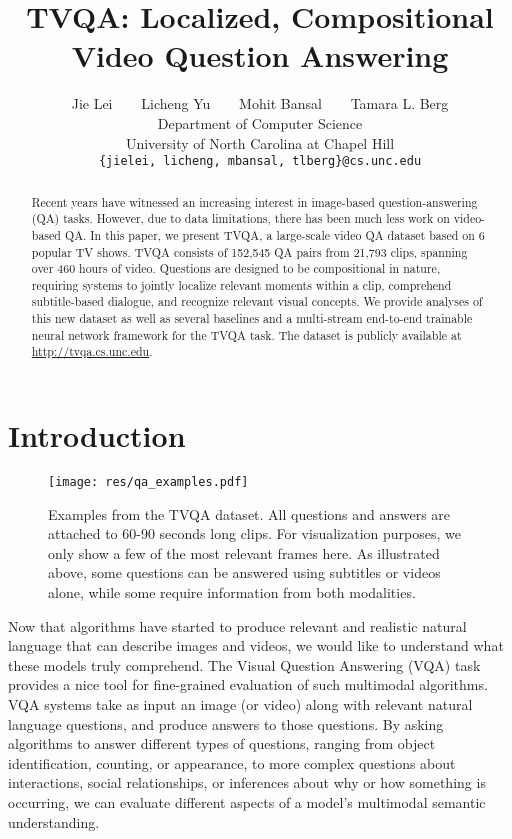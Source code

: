 \documentclass[11pt,a4paper]{article}
\title{TVQA: Localized, Compositional Video Question Answering}
\author{
  Jie Lei $\;\;\;\;\;$ Licheng Yu $\;\;\;\;\;$ 
  Mohit Bansal $\;\;\;\;\;$ Tamara L. Berg \\
  Department of Computer Science \\ University of North Carolina at Chapel Hill \\
  {\tt \{jielei, licheng, mbansal, tlberg\}@cs.unc.edu} \\
  }
\date{}
\begin{document}
\maketitle
\begin{abstract}
Recent years have witnessed an increasing interest in image-based question-answering (QA) tasks.
However, due to data limitations, there has been much less work on video-based QA.
In this paper, we present TVQA, a large-scale video QA dataset based on 6 popular TV shows. TVQA consists of 152,545 QA pairs from 21,793 clips, spanning over 460 hours of video.
Questions are designed to be compositional in nature, requiring systems to jointly localize relevant moments within a clip, comprehend subtitle-based dialogue, and recognize relevant visual concepts.
We provide analyses of this new dataset as well as several baselines and a multi-stream end-to-end trainable neural network framework for the TVQA task. The dataset is publicly available at \url{http://tvqa.cs.unc.edu}.
\end{abstract}

\section{Introduction}

\begin{figure*}[ht!]
  \texttt{[image: res/qa\_examples.pdf]}
  \vspace{-10pt}
  \caption{Examples from the TVQA dataset. All questions and answers are attached to 60-90 seconds long clips. For visualization purposes, we only show a few of the most relevant frames here. As illustrated above, some questions can be answered using subtitles or videos alone, while some require information from both modalities.}
  \label{fig:qa_examples_main}
  \vspace{-10pt}
\end{figure*}

Now that algorithms have started to produce relevant and realistic natural language that can describe images and videos, we would like to understand what these models truly comprehend. The Visual Question Answering (VQA) task provides a nice tool for fine-grained evaluation of such multimodal algorithms. VQA systems take as input an image (or video) along with relevant natural language questions, and produce answers to those questions. By asking algorithms to answer different types of questions, ranging from object identification, counting, or appearance, to more complex questions about interactions, social relationships, or inferences about why or how something is occurring, we can evaluate different aspects of a model's multimodal semantic understanding. 
\end{document}
